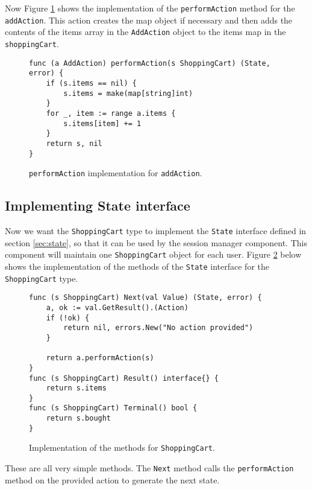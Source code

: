 Now Figure \ref{fig:addAction} shows the implementation of the \texttt{performAction}
method for the \texttt{addAction}. This action creates the map object if 
necessary and then adds the contents of the items array in the \texttt{AddAction}
object to the items map in the \texttt{shoppingCart}.
\begin{figure}[h]
\begin{lstlisting}
func (a AddAction) performAction(s ShoppingCart) (State, error) {
    if (s.items == nil) {
        s.items = make(map[string]int)
    }
    for _, item := range a.items {
        s.items[item] += 1
    }
    return s, nil
}
\end{lstlisting}
\caption[scale=1.0]{\texttt{performAction} implementation for \texttt{addAction}.}
\label{fig:addAction}
\end{figure}

\subsection{Implementing State interface}
Now we want the \texttt{ShoppingCart} type to implement the \texttt{State} 
interface defined in section
\ref{sec:state}, so that it can be used by the session manager component.
This component will maintain one \texttt{ShoppingCart} object for each user.
Figure \ref{fig:shoppingCartImpl} below shows the implementation of the 
methods of the \texttt{State} interface for the \texttt{ShoppingCart} type.
\begin{figure}[h]
\begin{lstlisting}
func (s ShoppingCart) Next(val Value) (State, error) {
    a, ok := val.GetResult().(Action)
    if (!ok) {
        return nil, errors.New("No action provided")
    }

    return a.performAction(s)
}
func (s ShoppingCart) Result() interface{} {
    return s.items
}
func (s ShoppingCart) Terminal() bool {
    return s.bought
}
\end{lstlisting}
\caption[scale=1.0]{Implementation of the methods for \texttt{ShoppingCart}.}
\label{fig:shoppingCartImpl}
\end{figure}
These are all very simple methods. The \texttt{Next} method calls 
the \texttt{performAction} method on the provided action to generate 
the next state.

